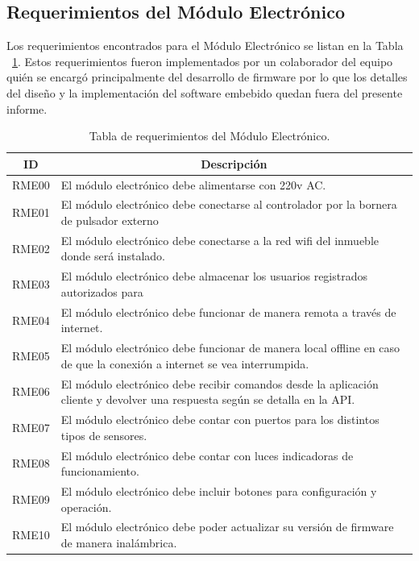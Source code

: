 \subsection{Requerimientos del Módulo Electrónico}
Los requerimientos encontrados para el Módulo Electrónico se listan en la Tabla ~\ref{table:req_modulo_electro}.
Estos requerimientos fueron implementados por un colaborador del equipo quién se encargó principalmente del desarrollo de firmware por lo que los detalles del diseño y la implementación del software embebido quedan fuera del presente informe. 
\begin{table}[ht]
		\begin{tabular}{|c|m{12cm}|}
			\hline
			\textbf{ID} & \multicolumn{1}{c|}{\textbf{Descripción}}                                                                                    \\ \hline
			RME00       & El módulo electrónico debe alimentarse con 220v AC.                                                                          \\ \hline
			RME01       & El módulo electrónico debe conectarse al controlador por la bornera de pulsador externo                                      \\ \hline
			RME02       & El módulo electrónico debe conectarse a la red wifi del inmueble donde será instalado.                                       \\ \hline
			RME03       & El módulo electrónico debe almacenar los usuarios registrados autorizados para                                               \\ \hline
			RME04       & El módulo electrónico debe funcionar de manera remota a través de internet.                                                  \\ \hline
			RME05       & El módulo electrónico debe funcionar de manera local offline en caso de que la conexión a internet se vea interrumpida.      \\ \hline
			RME06       & El módulo electrónico debe recibir comandos desde la aplicación cliente y devolver una respuesta según se detalla en la API. \\ \hline
			RME07       & El módulo electrónico debe contar con puertos para los distintos tipos de sensores.                                          \\ \hline
			RME08       & El módulo electrónico debe contar con luces indicadoras de funcionamiento.                                                   \\ \hline
			RME09       & El módulo electrónico debe incluir botones para configuración y operación.                                                   \\ \hline
			RME10       & El módulo electrónico debe poder actualizar su versión de firmware de manera inalámbrica.                                    \\ \hline
		\end{tabular}
	\caption[Requerimientos del Módulo Electrónico]{Tabla de requerimientos del Módulo Electrónico.}
	\label{table:req_modulo_electro}
\end{table}
